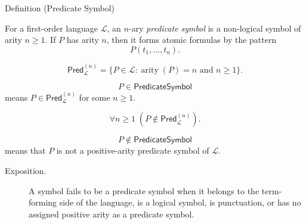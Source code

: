 \begin{definitionbox}{Definition (Predicate Symbol)}
\begin{definition}
\label{def:predicate-symbol}
For a first-order language \(\mathcal L\), an \(n\)-ary \emph{predicate symbol}
is a non-logical symbol of arity \(n\geq 1\). If \(P\) has arity \(n\), then it
forms atomic formulas by the pattern
\[
P(t_1,\ldots,t_n).
\]
\end{definition}
\end{definitionbox}

\begin{remark*}
\[
\mathsf{Pred}_{\mathcal L}^{(n)}
=
\{P\in\mathcal L : \operatorname{arity}(P)=n\text{ and }n\geq 1\}.
\]
\end{remark*}

\begin{remark*}
\[
  P\in\mathsf{PredicateSymbol}
\] means
\(P\in\mathsf{Pred}_{\mathcal L}^{(n)}\) for some \(n\geq 1\).
\end{remark*}

\begin{remark*}
\[
\forall n\geq 1\;(P\notin\mathsf{Pred}_{\mathcal L}^{(n)}).
\]
\end{remark*}

\begin{remark*}
\[
  P\notin\mathsf{PredicateSymbol}
\] means that \(P\) is not a positive-arity
predicate symbol of \(\mathcal L\).
\end{remark*}

\begin{remark*}
\begin{description}
  \item[Exposition.] A symbol fails to be a predicate symbol when it belongs to the term-forming
side of the language, is a logical symbol, is punctuation, or has no assigned
positive arity as a predicate symbol.
\end{description}
\end{remark*}

